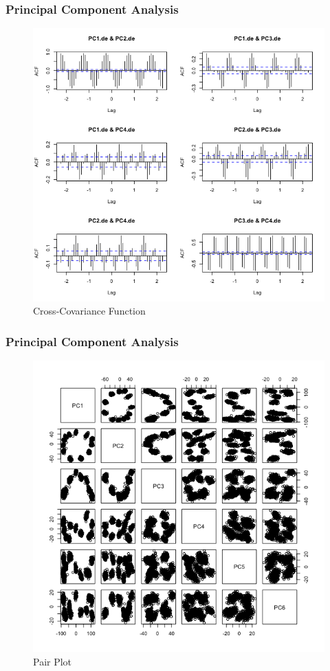 \documentclass{beamer}
\begin{document}
\begin{frame}
\frametitle{Principal Component Analysis}
\begin{figure}
	\centering
	\includegraphics[width=0.7\linewidth]{../img/PCAde_CCF}
	\caption{Cross-Covariance Function}
	\label{fig:pcadpeccf}
\end{figure}
\end{frame}

\begin{frame}
\frametitle{Principal Component Analysis}
\begin{figure}
	\centering
	\includegraphics[width=0.7\linewidth]{../img/PCAde_pair}
	\caption{Pair Plot}
	\label{fig:pcade_pair}
\end{figure}
\end{frame}
\end{document}
